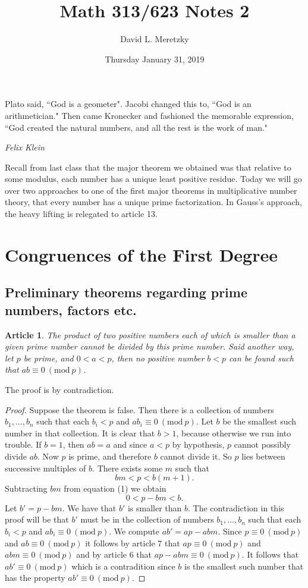 \documentclass{article}
\title{ \vspace{-10ex} %
Math 313/623 Notes 2
}
\author{David L. Meretzky
}
\date{%
Thursday January 31, 2019
}
\theoremstyle{problemstyle}
\newtheorem{article}{Article}
\newcommand{\Mod}[1]{\ (\mathrm{mod}\ #1)}
\begin{document}
\maketitle

\epigraph{Plato said, ``God is a geometer". Jacobi changed this to, ``God is an arithmetician." Then came Kronecker and fashioned the memorable expression, ``God created the natural numbers, and all the rest is the work of man."}{\textit{Felix Klein}}

Recall from last class that the major theorem we obtained was that relative to some modulus, each number has a unique least positive residue. Today we will go over two approaches to one of the first major theorems in multiplicative number theory, that every number has a unique prime factorization. In Gauss's approach, the heavy lifting is relegated to article 13.

\setcounter{section}{1}
\section{Congruences of the First Degree}

\setcounter{article}{12}

\subsection{Preliminary theorems regarding prime numbers, factors etc.}

\begin{article}
The product of two positive numbers each of which is smaller than a given prime number cannot be divided by this prime number.  Said another way, let $p$ be prime, and $0<a<p$, then no positive number $b<p$ can be found such that $ab \equiv 0 \Mod{p}$.  
\end{article}

The proof is by contradiction. 

\begin{proof}
Suppose the theorem is false. Then there is a collection of numbers $b_1,...,b_n$ such that each $b_i < p$ and $ab_i \equiv 0 \Mod{p}$. Let $b$ be the smallest such number in that collection. It is clear that $b >1$, because otherwise we run into trouble. If $b = 1$, then $ab = a$ and since $a < p$ by hypothesis, $p$ cannot possibly divide $ab$. Now $p$ is prime, and therefore $b$ cannot divide it. So $p$ lies between successive multiples of $b$.   There exists some $m$ such that \begin{equation}bm < p < b(m+1).\end{equation} Subtracting $bm$ from equation (1) we obtain  $$0 < p-bm < b.$$ Let $b' = p-bm$. We have that $b'$ is smaller than $b$. The contradiction in this proof will be that $b'$ must be in the collection of numbers $b_1,...,b_n$ such that each $b_i < p$ and $ab_i \equiv 0 \Mod{p}$. We compute $ab' = ap-abm$. Since $p \equiv 0 \Mod{p}$ and $ab \equiv 0 \Mod{p}$ it follows by article 7 that $ap \equiv 0 \Mod{p}$ and $abm \equiv 0 \Mod{p}$ and by article 6 that $ap-abm \equiv 0 \Mod{p}$. It follows that $ab' \equiv 0 \Mod{p}$ which is a contradition since $b$ is the smallest such number that has the property $ab' \equiv 0 \Mod{p}$. 
\end{proof}
\end{document}
